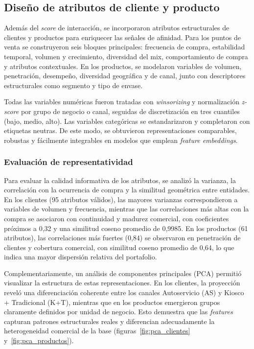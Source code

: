 \subsection{Diseño de atributos de cliente y producto}

Además del \textit{score} de interacción, se incorporaron atributos estructurales de clientes y productos para enriquecer las señales de afinidad. Para los puntos de venta se construyeron seis bloques principales: frecuencia de compra, estabilidad temporal, volumen y crecimiento, diversidad del mix, comportamiento de compra y atributos contextuales. En los productos, se modelaron variables de volumen, penetración, desempeño, diversidad geográfica y de canal, junto con descriptores estructurales como segmento y tipo de envase. 

Todas las variables numéricas fueron tratadas con \textit{winsorizing} y normalización \textit{z-score} por grupo de negocio o canal, seguidas de discretización en tres cuantiles (bajo, medio, alto). Las variables categóricas se estandarizaron y completaron con etiquetas neutras. De este modo, se obtuvieron representaciones comparables, robustas y fácilmente integrables en modelos que emplean \textit{feature embeddings}.

\subsubsection{Evaluación de representatividad}

Para evaluar la calidad informativa de los atributos, se analizó la varianza, la correlación con la ocurrencia de compra y la similitud geométrica entre entidades. En los clientes (95 atributos válidos), las mayores varianzas correspondieron a variables de volumen y frecuencia, mientras que las correlaciones más altas con la compra se asociaron con continuidad y madurez comercial, con coeficientes próximos a 0,32 y una similitud coseno promedio de 0,9985. En los productos (61 atributos), las correlaciones más fuertes (0,84) se observaron en penetración de clientes y cobertura comercial, con similitud coseno promedio de 0,64, lo que indica una mayor dispersión relativa del portafolio.

Complementariamente, un análisis de componentes principales (PCA) permitió visualizar la estructura de estas representaciones. En los clientes, la proyección reveló una diferenciación coherente entre los canales Autoservicio (AS) y Kiosco + Tradicional (K+T), mientras que en los productos emergieron grupos claramente definidos por unidad de negocio. Esto demuestra que las \textit{features} capturan patrones estructurales reales y diferencian adecuadamente la heterogeneidad comercial de la base (figuras~\ref{fig:pca_clientes} y~\ref{fig:pca_productos}).

